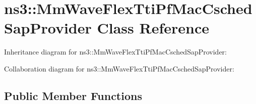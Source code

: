 \hypertarget{classns3_1_1MmWaveFlexTtiPfMacCschedSapProvider}{}\section{ns3\+:\+:Mm\+Wave\+Flex\+Tti\+Pf\+Mac\+Csched\+Sap\+Provider Class Reference}
\label{classns3_1_1MmWaveFlexTtiPfMacCschedSapProvider}


Inheritance diagram for ns3\+:\+:Mm\+Wave\+Flex\+Tti\+Pf\+Mac\+Csched\+Sap\+Provider\+:


Collaboration diagram for ns3\+:\+:Mm\+Wave\+Flex\+Tti\+Pf\+Mac\+Csched\+Sap\+Provider\+:
\subsection*{Public Member Functions}
